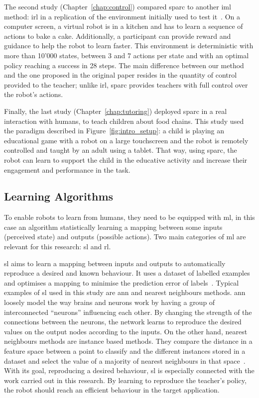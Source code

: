 The second study (Chapter~\ref{chap:control}) compared \gls{sparc} to another \gls{iml} method: \gls{irl} in a replication of the environment initially used to test it~\citep{thomaz2008teachable}. On a computer screen, a virtual robot is in a kitchen and has to learn a sequence of actions to bake a cake. Additionally, a participant can provide reward and guidance to help the robot to learn faster. This environment is deterministic with more than 10'000 states, between 3 and 7 actions per state and with an optimal policy reaching a success in 28 steps. The main difference between our method and the one proposed in the original paper resides in the quantity of control provided to the teacher; unlike \gls{irl}, \gls{sparc} provides teachers with full control over the robot's actions. 

Finally, the last study (Chapter~\ref{chap:tutoring}) deployed \gls{sparc} in a real interaction with humans, to teach children about food chains. This study used the paradigm described in Figure~\ref{fig:intro_setup}: a child is playing an educational game with a robot on a large touchscreen and the robot is remotely controlled and taught by an adult using a tablet. That way, using \gls{sparc}, the robot can learn to support the child in the educative activity and increase their engagement and performance in the task.

\subsection{Learning Algorithms}

To enable robots to learn from humans, they need to be equipped with \acrfull{ml}, in this case an algorithm statistically learning a mapping between some inputs (perceived state) and outputs (possible actions). Two main categories of \gls{ml} are relevant for this research: \gls{sl} and \gls{rl}.

\gls{sl} aims to learn a mapping between inputs and outputs to automatically reproduce a desired and known behaviour. It uses a dataset of labelled examples and optimises a mapping to minimise the prediction error of labels~\citep{russell2016artificial}. Typical examples of \gls{sl} used in this study are \gls{ann} and nearest neighbours methods. \gls{ann} loosely model the way brains and neurons work by having a group of interconnected ``neurons'' influencing each other. By changing the strength of the connections between the neurons, the network learns to reproduce the desired values on the output nodes according to the inputs. On the other hand, nearest neighbours methods are instance based methods. They compare the distance in a feature space between a point to classify and the different instances stored in a dataset and select the value of a majority of nearest neighbours in that space~\citep{cover1967nearest}. With its goal, reproducing a desired behaviour, \gls{sl} is especially connected with the work carried out in this research. By learning to reproduce the teacher's policy, the robot should reach an efficient behaviour in the target application.

